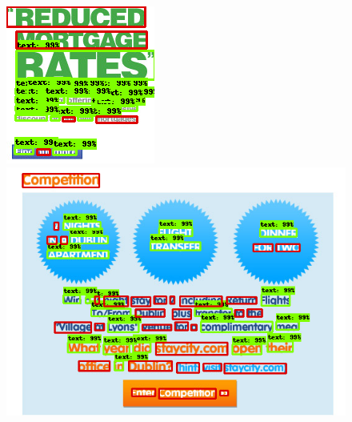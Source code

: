 \begin{figure}[!h]
	\centering

    \includegraphics[height=0.20\textheight]{VISAPP/figs/qualitative-results/icdar11/22m.png}
    \includegraphics[height=0.20\textheight]{VISAPP/figs/qualitative-results/icdar11/53m.png}

    \vspace{1.5mm}


\end{figure}
